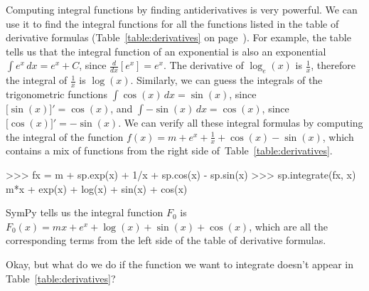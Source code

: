 			Computing integral functions by finding antiderivatives is very powerful.
			We can use it to find the integral functions
			for all the functions listed in the table of derivative formulas
			(Table~\ref{table:derivatives} on page~\pageref{table:derivatives}).
			For example,
			the table tells us that the integral function of an exponential
			is also an exponential $\int e^x \,dx = e^x + C$,
			since $\frac{d}{dx}[e^x] = e^x$.
			The derivative of $\log_e(x)$ is $\frac{1}{x}$,
			therefore the integral of $\frac{1}{x}$ is $\log(x)$.
			Similarly,
			we can guess the integrals of the trigonometric functions
			$\int \cos(x) \,dx = \sin(x)$, since $\big[\!\sin(x)\big]' = \cos(x)$,
			and $\int - \sin(x) \,dx = \cos(x)$, since $\big[\!\cos(x)\big]' = - \sin(x)$.
			We can verify all these integral formulas by computing
			the integral of the function $f(x) = m + e^x + \frac{1}{x} + \cos(x) - \sin(x)$,
			which contains a mix of functions from the right side of~Table~\ref{table:derivatives}.

			\begin{codeblock}[]
			>>> fx = m + sp.exp(x) + 1/x + sp.cos(x) - sp.sin(x)
			>>> sp.integrate(fx, x)
			m*x + exp(x) + log(x) + sin(x) + cos(x)
			\end{codeblock}

			\noindent
			SymPy tells us the integral function
			$F_0$ is $F_0(x) = mx + e^x + \log(x) + \sin(x) + \cos(x)$,
			which are all the corresponding terms from the left side of the table of derivative formulas.


			\noindent
			Okay,
			but what do we do if the function we want to integrate
			doesn't appear in Table~\ref{table:derivatives}?


